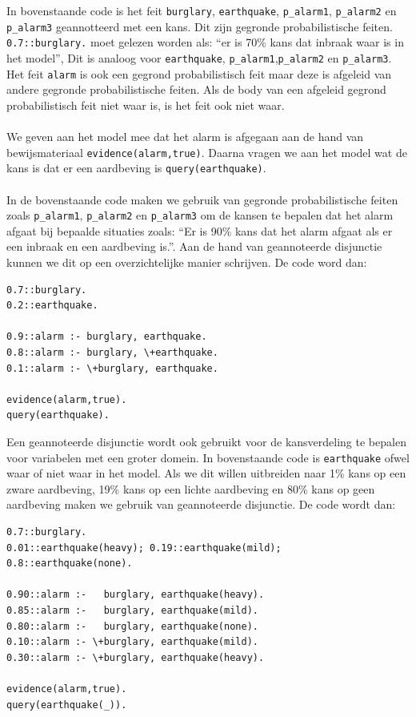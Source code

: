 \documentclass[12pt,a4paper,oneside]{book}
\theoremstyle{definition}
\newcommand{\quotes}[1]{``#1''}
\begin{document}
In bovenstaande code is het feit \texttt{burglary}, \texttt{earthquake}, \texttt{p\_alarm1}, \texttt{p\_alarm2} en \texttt{p\_alarm3} geannotteerd met een kans. Dit zijn gegronde probabilistische feiten. \texttt{0.7::burglary.} moet gelezen worden als: \quotes{er is 70\% kans dat inbraak waar is in het model}, Dit is analoog voor \texttt{earthquake}, \texttt{p\_alarm1},\texttt{p\_alarm2} en \texttt{p\_alarm3}. Het feit \texttt{alarm} is ook een gegrond probabilistisch feit maar deze is afgeleid van andere gegronde probabilistische feiten. Als de body van een afgeleid gegrond probabilistisch feit niet waar is, is het feit ook niet waar.
\\\\
We geven aan het model mee dat het alarm is afgegaan aan de hand van bewijsmateriaal \texttt{evidence(alarm,true)}. Daarna vragen we aan het model wat de kans is dat er een aardbeving is \texttt{query(earthquake)}.
\\\\
In de bovenstaande code maken we gebruik van gegronde probabilistische feiten zoals \texttt{p\_alarm1}, \texttt{p\_alarm2} en \texttt{p\_alarm3} om de kansen te bepalen dat het alarm afgaat bij bepaalde situaties zoals: \quotes{Er is 90\% kans dat het alarm afgaat als er een inbraak en een aardbeving is.}. Aan de hand van geannoteerde disjunctie kunnen we dit op een overzichtelijke manier schrijven. De code word dan:
\begin{verbatim}
0.7::burglary.
0.2::earthquake.

0.9::alarm :- burglary, earthquake.
0.8::alarm :- burglary, \+earthquake.
0.1::alarm :- \+burglary, earthquake.

evidence(alarm,true).
query(earthquake).
\end{verbatim}
Een geannoteerde disjunctie wordt ook gebruikt voor de kansverdeling te bepalen voor variabelen met een groter domein. In bovenstaande code is \texttt{earthquake} ofwel waar of niet waar in het model. Als we dit willen uitbreiden naar 1\% kans op een zware aardbeving, 19\% kans op een lichte aardbeving en 80\% kans op geen aardbeving maken we gebruik van geannoteerde disjunctie. De code wordt dan:
\begin{verbatim}
0.7::burglary.
0.01::earthquake(heavy); 0.19::earthquake(mild); 0.8::earthquake(none).

0.90::alarm :-   burglary, earthquake(heavy).
0.85::alarm :-   burglary, earthquake(mild).
0.80::alarm :-   burglary, earthquake(none).
0.10::alarm :- \+burglary, earthquake(mild).
0.30::alarm :- \+burglary, earthquake(heavy).

evidence(alarm,true).
query(earthquake(_)).
\end{verbatim}
\end{document}
